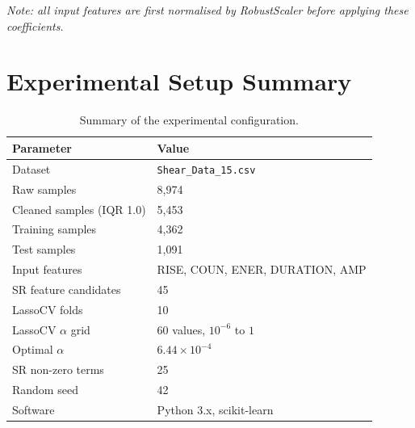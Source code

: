 \documentclass[12pt,a4paper]{article}
\begin{document}
\noindent\textit{Note: all input features are first normalised by RobustScaler
before applying these coefficients.}

\section{Experimental Setup Summary}
\label{app:setup}

\begin{table}[H]
  \centering
  \caption{Summary of the experimental configuration.}
  \label{tab:setup}
  \begin{tabular}{ll}
    \toprule
    \textbf{Parameter} & \textbf{Value} \\
    \midrule
    Dataset                    & \texttt{Shear\_Data\_15.csv} \\
    Raw samples                & 8,974 \\
    Cleaned samples (IQR 1.0)  & 5,453 \\
    Training samples           & 4,362 \\
    Test samples               & 1,091 \\
    Input features             & RISE, COUN, ENER, DURATION, AMP \\
    SR feature candidates      & 45 \\
    LassoCV folds              & 10 \\
    LassoCV $\alpha$ grid      & 60 values, $10^{-6}$ to $1$ \\
    Optimal $\alpha$           & $6.44 \times 10^{-4}$ \\
    SR non-zero terms          & 25 \\
    Random seed                & 42 \\
    Software                   & Python 3.x, scikit-learn \\
    \bottomrule
  \end{tabular}
\end{table}
\end{document}
